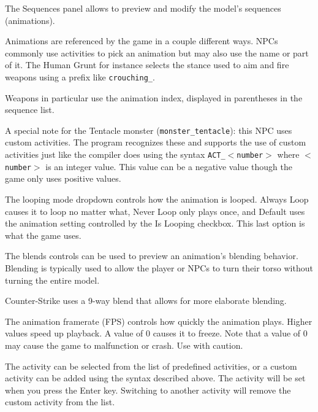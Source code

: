 \documentclass[10pt, a4paper, titlepage, oneside]{article}
\newcommand{\code}[1]{\mbox{\texttt{#1}}}
\begin{document}
The Sequences panel allows to preview and modify the model's sequences (animations).

\vspace{\baselineskip}
Animations are referenced by the game in a couple different ways. NPCs commonly use activities to pick an animation but may also use the name or part of it. The Human Grunt for instance selects the stance used to aim and fire weapons using a prefix like \code{crouching\_}.

\vspace{\baselineskip}
Weapons in particular use the animation index, displayed in parentheses in the sequence list.

\vspace{\baselineskip}
A special note for the Tentacle monster (\code{monster\_tentacle}): this NPC uses custom activities. The program recognizes these and supports the use of custom activities just like the compiler does using the syntax \code{ACT\_$<$number$>$} where \code{$<$number$>$} is an integer value. This value can be a negative value though the game only uses positive values.

\vspace{\baselineskip}
The looping mode dropdown controls how the animation is looped. Always Loop causes it to loop no matter what, Never Loop only plays once, and Default uses the animation setting controlled by the Is Looping checkbox. This last option is what the game uses.

\vspace{\baselineskip}
The blends controls can be used to preview an animation's blending behavior. Blending is typically used to allow the player or NPCs to turn their torso without turning the entire model.

\vspace{\baselineskip}
Counter-Strike uses a 9-way blend that allows for more elaborate blending.

\vspace{\baselineskip}
The animation framerate (FPS) controls how quickly the animation plays. Higher values speed up playback. A value of 0 causes it to freeze. Note that a value of 0 may cause the game to malfunction or crash. Use with caution.

\vspace{\baselineskip}
The activity can be selected from the list of predefined activities, or a custom activity can be added using the syntax described above. The activity will be set when you press the Enter key. Switching to another activity will remove the custom activity from the list.
\end{document}

